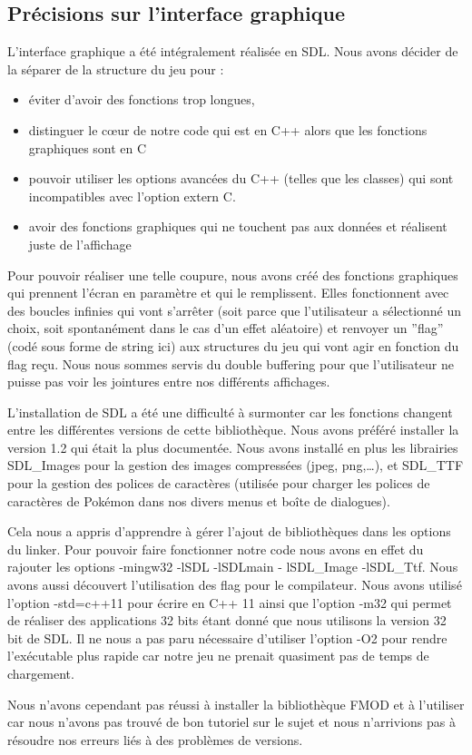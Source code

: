 \subsection{Précisions sur l'interface graphique}
L'interface graphique a été intégralement réalisée en SDL. Nous avons décider de la séparer de la structure du jeu pour :
\begin{itemize}
\item éviter d'avoir des fonctions trop longues,
\item  distinguer le cœur de notre code qui est en C++ alors que les fonctions graphiques sont en C
\item pouvoir utiliser les options avancées du C++ (telles que les classes) qui sont incompatibles avec l'option extern C. 
\item avoir des fonctions graphiques qui ne touchent pas aux données et réalisent juste de l'affichage
\end{itemize}
Pour pouvoir réaliser une telle coupure, nous avons créé des fonctions graphiques qui prennent l'écran en paramètre et qui le remplissent. Elles fonctionnent avec des boucles infinies qui vont s’arrêter (soit parce que l'utilisateur a sélectionné un choix, soit spontanément dans le cas d'un effet aléatoire) et renvoyer un ''flag'' (codé sous forme de string ici) aux structures du jeu qui vont agir en fonction du flag reçu. Nous nous sommes servis du double buffering pour que l'utilisateur ne puisse pas voir les jointures entre nos différents affichages. 

L'installation de SDL a été une difficulté à surmonter car les fonctions changent entre les différentes versions de cette bibliothèque. Nous avons préféré installer la version 1.2 qui était la plus documentée. Nous avons installé en plus les librairies SDL\_Images pour la gestion des images compressées (jpeg, png,\dots), et SDL\_TTF pour la gestion des polices de caractères (utilisée pour charger les polices de caractères de Pokémon dans nos divers menus et boîte de dialogues). 

Cela nous a appris d'apprendre à gérer l'ajout de bibliothèques dans les options du linker. Pour pouvoir faire fonctionner notre code nous avons en effet du rajouter les options  -mingw32 -lSDL -lSDLmain - lSDL\_Image -lSDL\_Ttf. Nous avons aussi découvert l'utilisation des flag pour le compilateur. Nous avons utilisé l'option -std=c++11 pour écrire en C++ 11 ainsi que l'option -m32 qui permet de réaliser des applications 32 bits étant donné que nous utilisons la version 32 bit de SDL. Il ne nous a pas paru nécessaire d'utiliser l'option -O2 pour rendre l’exécutable plus rapide car notre jeu ne prenait quasiment pas de temps de chargement. 

Nous n'avons cependant pas réussi à installer la bibliothèque FMOD et à l'utiliser car nous n'avons pas trouvé de bon tutoriel sur le sujet et nous n'arrivions pas à résoudre nos erreurs liés à des problèmes de versions. 

